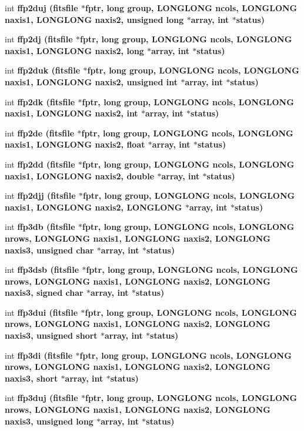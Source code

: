 \begin{CompactItemize}
\item 
int \bf{ffp2duj} (\bf{fitsfile} $\ast$fptr, long group, \bf{LONGLONG} ncols, \bf{LONGLONG} naxis1, \bf{LONGLONG} naxis2, unsigned long $\ast$array, int $\ast$status)
\item 
int \bf{ffp2dj} (\bf{fitsfile} $\ast$fptr, long group, \bf{LONGLONG} ncols, \bf{LONGLONG} naxis1, \bf{LONGLONG} naxis2, long $\ast$array, int $\ast$status)
\item 
int \bf{ffp2duk} (\bf{fitsfile} $\ast$fptr, long group, \bf{LONGLONG} ncols, \bf{LONGLONG} naxis1, \bf{LONGLONG} naxis2, unsigned int $\ast$array, int $\ast$status)
\item 
int \bf{ffp2dk} (\bf{fitsfile} $\ast$fptr, long group, \bf{LONGLONG} ncols, \bf{LONGLONG} naxis1, \bf{LONGLONG} naxis2, int $\ast$array, int $\ast$status)
\item 
int \bf{ffp2de} (\bf{fitsfile} $\ast$fptr, long group, \bf{LONGLONG} ncols, \bf{LONGLONG} naxis1, \bf{LONGLONG} naxis2, float $\ast$array, int $\ast$status)
\item 
int \bf{ffp2dd} (\bf{fitsfile} $\ast$fptr, long group, \bf{LONGLONG} ncols, \bf{LONGLONG} naxis1, \bf{LONGLONG} naxis2, double $\ast$array, int $\ast$status)
\item 
int \bf{ffp2djj} (\bf{fitsfile} $\ast$fptr, long group, \bf{LONGLONG} ncols, \bf{LONGLONG} naxis1, \bf{LONGLONG} naxis2, \bf{LONGLONG} $\ast$array, int $\ast$status)
\item 
int \bf{ffp3db} (\bf{fitsfile} $\ast$fptr, long group, \bf{LONGLONG} ncols, \bf{LONGLONG} nrows, \bf{LONGLONG} naxis1, \bf{LONGLONG} naxis2, \bf{LONGLONG} naxis3, unsigned char $\ast$array, int $\ast$status)
\item 
int \bf{ffp3dsb} (\bf{fitsfile} $\ast$fptr, long group, \bf{LONGLONG} ncols, \bf{LONGLONG} nrows, \bf{LONGLONG} naxis1, \bf{LONGLONG} naxis2, \bf{LONGLONG} naxis3, signed char $\ast$array, int $\ast$status)
\item 
int \bf{ffp3dui} (\bf{fitsfile} $\ast$fptr, long group, \bf{LONGLONG} ncols, \bf{LONGLONG} nrows, \bf{LONGLONG} naxis1, \bf{LONGLONG} naxis2, \bf{LONGLONG} naxis3, unsigned short $\ast$array, int $\ast$status)
\item 
int \bf{ffp3di} (\bf{fitsfile} $\ast$fptr, long group, \bf{LONGLONG} ncols, \bf{LONGLONG} nrows, \bf{LONGLONG} naxis1, \bf{LONGLONG} naxis2, \bf{LONGLONG} naxis3, short $\ast$array, int $\ast$status)
\item 
int \bf{ffp3duj} (\bf{fitsfile} $\ast$fptr, long group, \bf{LONGLONG} ncols, \bf{LONGLONG} nrows, \bf{LONGLONG} naxis1, \bf{LONGLONG} naxis2, \bf{LONGLONG} naxis3, unsigned long $\ast$array, int $\ast$status)

\end{CompactItemize}
